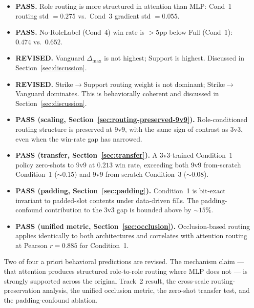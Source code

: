 \begin{itemize}
  \item \textbf{PASS.} Role routing is more structured in attention than MLP: Cond~1 routing std $= 0.275$ vs.\ Cond~3 gradient std $= 0.055$.
  \item \textbf{PASS.} No-RoleLabel (Cond~4) win rate is $>5$pp below Full (Cond~1): $0.474$ vs.\ $0.652$.
  \item \textbf{REVISED.} Vanguard $\Delta_{\max}$ is not highest; Support is highest. Discussed in Section~\ref{sec:discussion}.
  \item \textbf{REVISED.} Strike$\to$Support routing weight is not dominant; Strike$\to$Vanguard dominates. This is behaviorally coherent and discussed in Section~\ref{sec:discussion}.
  \item \textbf{PASS (scaling, Section~\ref{sec:routing-preserved-9v9}).} Role-conditioned routing structure is preserved at 9v9, with the same sign of contrast as 3v3, even when the win-rate gap has narrowed.
  \item \textbf{PASS (transfer, Section~\ref{sec:transfer}).} A 3v3-trained Condition~1 policy zero-shots to 9v9 at $0.213$ win rate, exceeding both 9v9 from-scratch Condition~1 ($\sim 0.15$) and 9v9 from-scratch Condition~3 ($\sim 0.08$).
  \item \textbf{PASS (padding, Section~\ref{sec:padding}).} Condition~1 is bit-exact invariant to padded-slot contents under data-driven fills. The padding-confound contribution to the 3v3 gap is bounded above by $\sim 15\%$.
  \item \textbf{PASS (unified metric, Section~\ref{sec:occlusion}).} Occlusion-based routing applies identically to both architectures and correlates with attention routing at Pearson $r{=}0.885$ for Condition~1.
\end{itemize}

Two of four a priori behavioral predictions are revised. The mechanism claim --- that attention produces structured role-to-role routing where MLP does not --- is strongly supported across the original Track~2 result, the cross-scale routing-preservation analysis, the unified occlusion metric, the zero-shot transfer test, and the padding-confound ablation.
